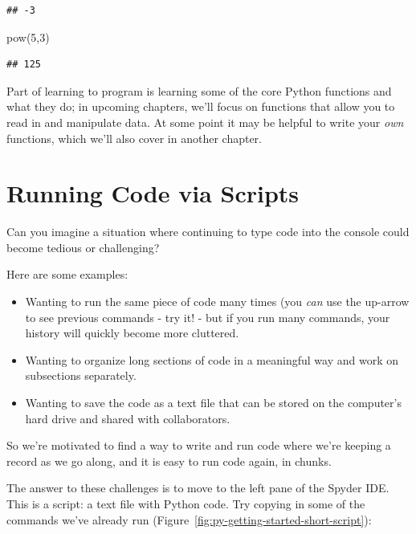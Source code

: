 \documentclass[]{Nemilov}
\newenvironment{Shaded}{\begin{snugshade}}{\end{snugshade}}
\newcommand{\BuiltInTok}[1]{#1}
\newcommand{\DecValTok}[1]{\textcolor[rgb]{0.00,0.00,0.81}{#1}}
\newcommand{\NormalTok}[1]{#1}
\providecommand{\tightlist}{%
  \setlength{\itemsep}{0pt}\setlength{\parskip}{0pt}}
\begin{document}
\begin{verbatim}
## -3
\end{verbatim}

\begin{Shaded}
\begin{Highlighting}[]
\BuiltInTok{pow}\NormalTok{(}\DecValTok{5}\NormalTok{,}\DecValTok{3}\NormalTok{)}
\end{Highlighting}
\end{Shaded}

\begin{verbatim}
## 125
\end{verbatim}

Part of learning to program is learning some of the core Python functions and
what they do; in upcoming chapters, we'll focus on functions that allow you to
read in and manipulate data. At some point it may be helpful to write your
\emph{own} functions, which we'll also cover in another chapter.

\hypertarget{py-getting-started-script}{%
\section{Running Code via Scripts}\label{py-getting-started-script}}

Can you imagine a situation where continuing to type code into the console
could become tedious or challenging?

Here are some examples:

\begin{itemize}
\tightlist
\item
  Wanting to run the same piece of code many times (you
  \emph{can} use the up-arrow to see previous commands - try it! - but if you
  run many commands, your history will quickly become more cluttered.
\item
  Wanting to organize long sections of code in a meaningful way and work on
  subsections separately.
\item
  Wanting to save the code as a text file that can be stored on the computer's
  hard drive and shared with collaborators.
\end{itemize}

So we're motivated to find a way to write and run code where we're keeping
a record as we go along, and it is easy to run code again, in chunks.

The answer to these challenges is to move to the left pane of the Spyder
IDE. This is a script: a text file with Python code. Try copying in some
of the commands we've already run (Figure~\ref{fig:py-getting-started-short-script}):
\end{document}
